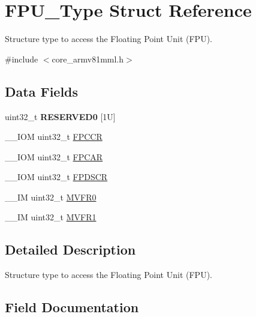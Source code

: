 \hypertarget{struct_f_p_u___type}{}\section{F\+P\+U\+\_\+\+Type Struct Reference}
\label{struct_f_p_u___type}


Structure type to access the Floating Point Unit (F\+PU).  




{\ttfamily \#include $<$core\+\_\+armv81mml.\+h$>$}

\subsection*{Data Fields}
\begin{DoxyCompactItemize}
\item 
\mbox{\label{struct_f_p_u___type_affae06cd6df5e9fe9a92994052fd3bec}} 
uint32\+\_\+t {\bfseries R\+E\+S\+E\+R\+V\+E\+D0} \mbox{[}1\+U\mbox{]}
\item 
\+\_\+\+\_\+\+I\+OM uint32\+\_\+t \mbox{\hyperlink{struct_f_p_u___type_a242040bad11980d6250848a44cc967e3}{F\+P\+C\+CR}}
\item 
\+\_\+\+\_\+\+I\+OM uint32\+\_\+t \mbox{\hyperlink{struct_f_p_u___type_a4fa83b560b046f9cec201c68fbe33507}{F\+P\+C\+AR}}
\item 
\+\_\+\+\_\+\+I\+OM uint32\+\_\+t \mbox{\hyperlink{struct_f_p_u___type_a05a8c9a999e6ca4ff19f30c93ec50217}{F\+P\+D\+S\+CR}}
\item 
\+\_\+\+\_\+\+IM uint32\+\_\+t \mbox{\hyperlink{struct_f_p_u___type_a9b0103b438c8922eaea5624f71afbbc8}{M\+V\+F\+R0}}
\item 
\+\_\+\+\_\+\+IM uint32\+\_\+t \mbox{\hyperlink{struct_f_p_u___type_a0a610dc4212de3ce1ad62e9afa76c728}{M\+V\+F\+R1}}
\end{DoxyCompactItemize}


\subsection{Detailed Description}
Structure type to access the Floating Point Unit (F\+PU). 

\subsection{Field Documentation}
\mbox{\label{struct_f_p_u___type_a4fa83b560b046f9cec201c68fbe33507}} 
